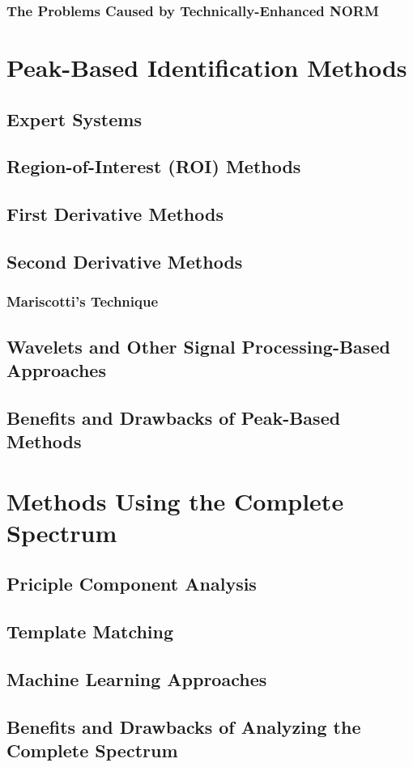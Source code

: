 \subsubsection{The Problems Caused by Technically-Enhanced NORM}

\section{Peak-Based Identification Methods}
\subsection{Expert Systems}
\subsection{Region-of-Interest (ROI) Methods}
\subsection{First Derivative Methods}
\subsection{Second Derivative Methods}
\subsubsection{Mariscotti's Technique}
\subsection{Wavelets and Other Signal Processing-Based Approaches}
\subsection{Benefits and Drawbacks of Peak-Based Methods}

\section{Methods Using the Complete Spectrum}
\subsection{Priciple Component Analysis}
\subsection{Template Matching}
\subsection{Machine Learning Approaches}
\subsection{Benefits and Drawbacks of Analyzing the Complete Spectrum}
